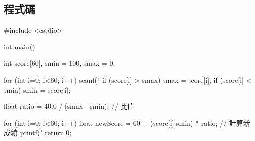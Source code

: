 \subsection{程式碼}
\begin{cppcode}
#include <cstdio>

int main()
{
	int score[60], smin = 100, smax = 0;

	for (int i=0; i<60; i++) {
		scanf("%
		if (score[i] > smax) smax = score[i];
		if (score[i] < smin) smin = score[i];
	}
	
	float ratio = 40.0 / (smax - smin); // 比值
	
	for (int i=0; i<60; i++) {
		float newScore = 60 + (score[i]-smin) * ratio; // 計算新成績
		printf("%
	}
	return 0;
}
\end{cppcode}
